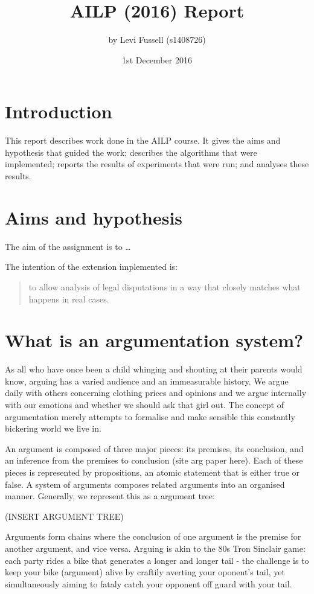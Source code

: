 \documentclass[10pt,a4paper,twocolumn]{article}
\title{AILP (2016) Report}               %
\author{by Levi Fussell (s1408726)}
\date{1st December 2016}                 %
\begin{document}
\maketitle  %
%
\section{Introduction}

This report describes work done in the AILP
course.  It gives the aims and hypothesis that guided the work;
describes the algorithms that were implemented;  reports the results
of experiments that were run;  and analyses these results.

\section{Aims and hypothesis}

The aim of the assignment is to \dots

The intention of the extension implemented is:
\begin{quote}
   to allow analysis of legal disputations in a way that closely matches
   what happens in real cases.
\end{quote}

\section{What is an argumentation system?}

As all who have
once been a child whinging and shouting at their parents would know, arguing has
a varied audience and an immeasurable history. We argue daily
with others concerning clothing prices and opinions and we argue internally with our
emotions and whether we should ask that girl out. The concept of argumentation merely attempts to
formalise and make sensible this constantly bickering world we live in.

An argument is composed of three major pieces: its premises, its conclusion,
and an inference from the premises to conclusion (site arg paper here). Each of
these pieces is represented by propositions, an atomic statement that is either
true or false. A system of arguments composes related arguments into an
organised manner. Generally, we represent this as a argument tree:

(INSERT ARGUMENT TREE)

Arguments form chains where the conclusion of one argument is the premise for
another argument, and vice versa. Arguing is akin to the 80s Tron Sinclair game:
each party rides a bike that generates a longer and longer tail - the
challenge is to keep your bike (argument) alive by craftily averting your
oponent's tail, yet
simultaneously aiming to fataly catch your opponent off guard with your tail.
\end{document}
